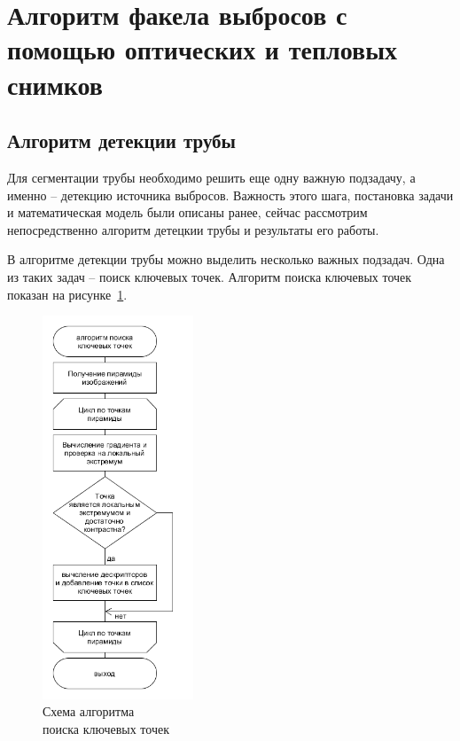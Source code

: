 \documentclass[14pt, a4paper]{extreport}
\begin{document}
\section[\vspace*{-0.22cm}Алгоритм сегментации факела выбросов с помощью оптических \\ \hspace*{-0.75cm}и тепловых снимков]{\vspace*{-0.22cm}Алгоритм  факела выбросов с помощью оптических и тепловых \\ \hspace*{-2.05cm}снимков}
\subsection{Алгоритм детекции трубы}
	
	Для сегментации трубы необходимо решить еще одну важную подзадачу, а именно -- детекцию источника выбросов. Важность этого шага, постановка задачи и математическая модель были описаны ранее, сейчас рассмотрим непосредственно алгоритм детецкии трубы и результаты его работы.
	
	В алгоритме детекции трубы можно выделить несколько важных подзадач. Одна из таких задач -- поиск ключевых точек. Алгоритм поиска ключевых точек показан на рисунке~\ref{fig:trubadetection}.
	\begin{figure}[h!]
		\centering
		\includegraphics[width = 0.4\textwidth]{image/chapter_3/trubadetection}	
		\vspace*{-0.4cm}\caption{Схема алгоритма \\поиска ключевых точек}
		\label{fig:trubadetection}
	\end{figure}
\end{document}
